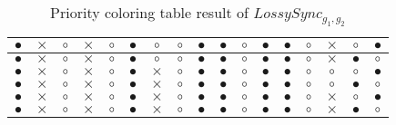 \begin{BehExample}
\begin{table}
{\begin{tabular}{|c|c|c|c|c|c|c|c|c|c|c|c|c|c|c|c|c|}
\hline
$\bullet$ & $\times$ & $\circ$ & $\times$ & $\circ$ & $\bullet$ & $\circ$ & $\circ$ & $\bullet$ & $\bullet$ & $\circ$ & $\bullet$ & $\bullet$ & $\circ$ & $\times$ & $\circ$ & $\bullet$ \\ 
\hline
$\bullet$ & $\times$ & $\circ$ & $\times$ & $\circ$ & $\bullet$ & $\circ$ & $\circ$ & $\bullet$ & $\bullet$ & $\circ$ & $\bullet$ & $\bullet$ & $\circ$ & $\times$ & $\bullet$ & $\circ$ \\ 
\hline
$\bullet$ & $\times$ & $\circ$ & $\times$ & $\circ$ & $\bullet$ & $\times$ & $\circ$ & $\bullet$ & $\bullet$ & $\circ$ & $\bullet$ & $\bullet$ & $\circ$ & $\circ$ & $\circ$ & $\bullet$ \\ 
\hline
$\bullet$ & $\times$ & $\circ$ & $\times$ & $\circ$ & $\bullet$ & $\times$ & $\circ$ & $\bullet$ & $\bullet$ & $\circ$ & $\bullet$ & $\bullet$ & $\circ$ & $\circ$ & $\bullet$ & $\circ$ \\ 
\hline
$\bullet$ & $\times$ & $\circ$ & $\times$ & $\circ$ & $\bullet$ & $\times$ & $\circ$ & $\bullet$ & $\bullet$ & $\circ$ & $\bullet$ & $\bullet$ & $\circ$ & $\times$ & $\circ$ & $\bullet$ \\ 
\hline
$\bullet$ & $\times$ & $\circ$ & $\times$ & $\circ$ & $\bullet$ & $\times$ & $\circ$ & $\bullet$ & $\bullet$ & $\circ$ & $\bullet$ & $\bullet$ & $\circ$ & $\times$ & $\bullet$ & $\circ$ \\ 
\hline
\end{tabular}
}
\caption{Priority coloring table result of $LossySync_{g_1, g_2}$}
\label{tab:j9}
\end{table}


\end{BehExample}
